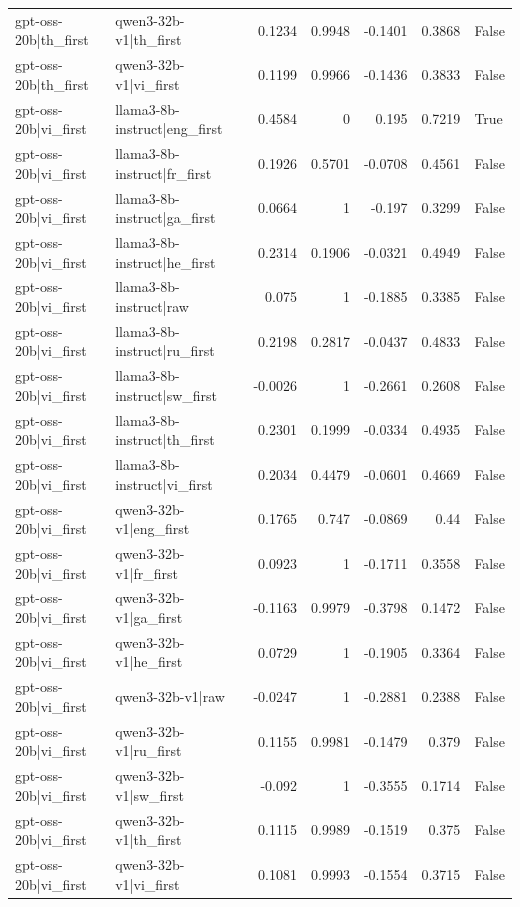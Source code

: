 \begin{table}
\begin{tabular}{l l r r r r l}
gpt-oss-20b|th_first & qwen3-32b-v1|th_first & 0.1234 & 0.9948 & -0.1401 & 0.3868 & False \\
gpt-oss-20b|th_first & qwen3-32b-v1|vi_first & 0.1199 & 0.9966 & -0.1436 & 0.3833 & False \\
gpt-oss-20b|vi_first & llama3-8b-instruct|eng_first & 0.4584 & 0 & 0.195 & 0.7219 & True \\
gpt-oss-20b|vi_first & llama3-8b-instruct|fr_first & 0.1926 & 0.5701 & -0.0708 & 0.4561 & False \\
gpt-oss-20b|vi_first & llama3-8b-instruct|ga_first & 0.0664 & 1 & -0.197 & 0.3299 & False \\
gpt-oss-20b|vi_first & llama3-8b-instruct|he_first & 0.2314 & 0.1906 & -0.0321 & 0.4949 & False \\
gpt-oss-20b|vi_first & llama3-8b-instruct|raw & 0.075 & 1 & -0.1885 & 0.3385 & False \\
gpt-oss-20b|vi_first & llama3-8b-instruct|ru_first & 0.2198 & 0.2817 & -0.0437 & 0.4833 & False \\
gpt-oss-20b|vi_first & llama3-8b-instruct|sw_first & -0.0026 & 1 & -0.2661 & 0.2608 & False \\
gpt-oss-20b|vi_first & llama3-8b-instruct|th_first & 0.2301 & 0.1999 & -0.0334 & 0.4935 & False \\
gpt-oss-20b|vi_first & llama3-8b-instruct|vi_first & 0.2034 & 0.4479 & -0.0601 & 0.4669 & False \\
gpt-oss-20b|vi_first & qwen3-32b-v1|eng_first & 0.1765 & 0.747 & -0.0869 & 0.44 & False \\
gpt-oss-20b|vi_first & qwen3-32b-v1|fr_first & 0.0923 & 1 & -0.1711 & 0.3558 & False \\
gpt-oss-20b|vi_first & qwen3-32b-v1|ga_first & -0.1163 & 0.9979 & -0.3798 & 0.1472 & False \\
gpt-oss-20b|vi_first & qwen3-32b-v1|he_first & 0.0729 & 1 & -0.1905 & 0.3364 & False \\
gpt-oss-20b|vi_first & qwen3-32b-v1|raw & -0.0247 & 1 & -0.2881 & 0.2388 & False \\
gpt-oss-20b|vi_first & qwen3-32b-v1|ru_first & 0.1155 & 0.9981 & -0.1479 & 0.379 & False \\
gpt-oss-20b|vi_first & qwen3-32b-v1|sw_first & -0.092 & 1 & -0.3555 & 0.1714 & False \\
gpt-oss-20b|vi_first & qwen3-32b-v1|th_first & 0.1115 & 0.9989 & -0.1519 & 0.375 & False \\
gpt-oss-20b|vi_first & qwen3-32b-v1|vi_first & 0.1081 & 0.9993 & -0.1554 & 0.3715 & False \\

\end{tabular}
\end{table}
